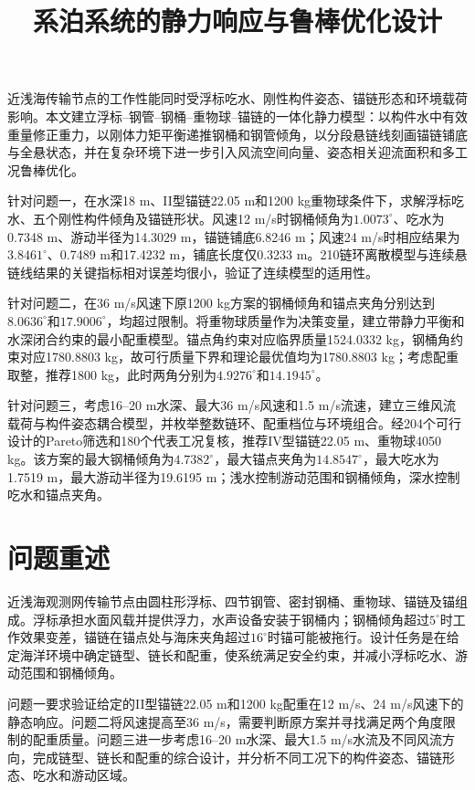 \documentclass[UTF8,zihao=-4,a4paper,fontset=fandol]{ctexart}
\title{系泊系统的静力响应与鲁棒优化设计}
\author{}
\date{}
\begin{document}
\maketitle

\begin{cumcmabstract}
近浅海传输节点的工作性能同时受浮标吃水、刚性构件姿态、锚链形态和环境载荷影响。本文建立浮标--钢管--钢桶--重物球--锚链的一体化静力模型：以构件水中有效重量修正重力，以刚体力矩平衡递推钢桶和钢管倾角，以分段悬链线刻画锚链铺底与全悬状态，并在复杂环境下进一步引入风流空间向量、姿态相关迎流面积和多工况鲁棒优化。

针对问题一，在水深18 m、II型锚链22.05 m和1200 kg重物球条件下，求解浮标吃水、五个刚性构件倾角及锚链形状。风速12 m/s时钢桶倾角为$1.0073^\circ$、吃水为0.7348 m、游动半径为14.3029 m，锚链铺底6.8246 m；风速24 m/s时相应结果为$3.8461^\circ$、0.7489 m和17.4232 m，铺底长度仅0.3233 m。210链环离散模型与连续悬链线结果的关键指标相对误差均很小，验证了连续模型的适用性。

针对问题二，在36 m/s风速下原1200 kg方案的钢桶倾角和锚点夹角分别达到$8.0636^\circ$和$17.9006^\circ$，均超过限制。将重物球质量作为决策变量，建立带静力平衡和水深闭合约束的最小配重模型。锚点角约束对应临界质量1524.0332 kg，钢桶角约束对应1780.8803 kg，故可行质量下界和理论最优值均为1780.8803 kg；考虑配重取整，推荐1800 kg，此时两角分别为$4.9276^\circ$和$14.1945^\circ$。

针对问题三，考虑16--20 m水深、最大36 m/s风速和1.5 m/s流速，建立三维风流载荷与构件姿态耦合模型，并枚举整数链环、配重档位与环境组合。经204个可行设计的Pareto筛选和180个代表工况复核，推荐IV型锚链22.05 m、重物球4050 kg。该方案的最大钢桶倾角为$4.7382^\circ$，最大锚点夹角为$14.8547^\circ$，最大吃水为1.7519 m，最大游动半径为19.6195 m；浅水控制游动范围和钢桶倾角，深水控制吃水和锚点夹角。
\end{cumcmabstract}

\CumcmBodyStart

\section{问题重述}
近浅海观测网传输节点由圆柱形浮标、四节钢管、密封钢桶、重物球、锚链及锚组成。浮标承担水面风载并提供浮力，水声设备安装于钢桶内；钢桶倾角超过$5^\circ$时工作效果变差，锚链在锚点处与海床夹角超过$16^\circ$时锚可能被拖行。设计任务是在给定海洋环境中确定链型、链长和配重，使系统满足安全约束，并减小浮标吃水、游动范围和钢桶倾角。

问题一要求验证给定的II型锚链22.05 m和1200 kg配重在12 m/s、24 m/s风速下的静态响应。问题二将风速提高至36 m/s，需要判断原方案并寻找满足两个角度限制的配重质量。问题三进一步考虑16--20 m水深、最大1.5 m/s水流及不同风流方向，完成链型、链长和配重的综合设计，并分析不同工况下的构件姿态、锚链形态、吃水和游动区域。
\end{document}

